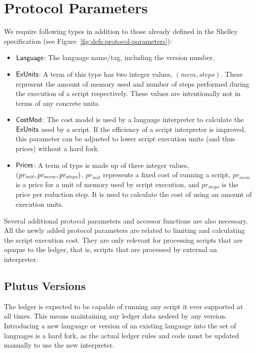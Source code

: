 \section{Protocol Parameters}
\label{sec:protocol-parameters}

We require following types
in addition to those already defined in the Shelley specification
(see Figure~\ref{fig:defs:protocol-parameters}):

\begin{itemize}
  \item $\mathsf{Language}$: The language name/tag, including the version number.
  \item $\mathsf{ExUnits}$: A term of this type has two integer values,
  $(mem, steps)$. These represent the amount of memory used and number
  of steps performed during the execution of a script
  respectively. These values are intentionally not in terms of any
  concrete units.
\item $\mathsf{CostMod}$: The cost model is used by a language interpreter to
  calculate the $\mathsf{ExUnits}$ used by a script. If the efficiency of a
  script interpreter is improved, this parameter can be adjusted to
  lower script execution units (and thus prices) without a hard fork.
  \item $\mathsf{Prices}$: A term of type is made up of three integer values,
  $\mathit{(pr_{init}, pr_{mem}, pr_{steps})}$. $pr_{init}$ represents a fixed
  cost of running a script, $pr_{mem}$ is a price for a unit of memory
  used by script execution, and $pr_{steps}$ is the price per
  reduction step. It is used to calculate the cost of using an amount of execution
  units.
\end{itemize}

Several additional protocol parameters and accessor functions are also necessary.
All the newly added protocol parameters are related to limiting and calculating
the script execution cost.
They are only relevant for processing scripts that are opaque
to the ledger, that is, scripts that are processed by external an interpreter.

\subsection{Plutus Versions}
\label{sec:versions}

The ledger is expected to be capable of running any script it ever
supported at all times. This means maintaining any ledger
data nedeed by any version. Introducing a new language or version of an existing language
into the set of languages is a hard fork, as the actual ledger rules
and code must be updated manually to use the new interpreter.

